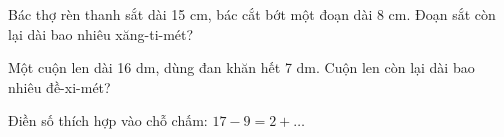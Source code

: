 \begin{ex}
Bác thợ rèn thanh sắt dài 15 cm, bác cắt bớt một đoạn dài 8 cm. Đoạn sắt còn lại dài bao nhiêu xăng-ti-mét?
\end{ex}

\begin{ex}
Một cuộn len dài 16 dm, dùng đan khăn hết 7 dm. Cuộn len còn lại dài bao nhiêu đề-xi-mét?
\end{ex}

\begin{ex}
Điền số thích hợp vào chỗ chấm: $17 - 9 = 2 + \dots$
\end{ex}
